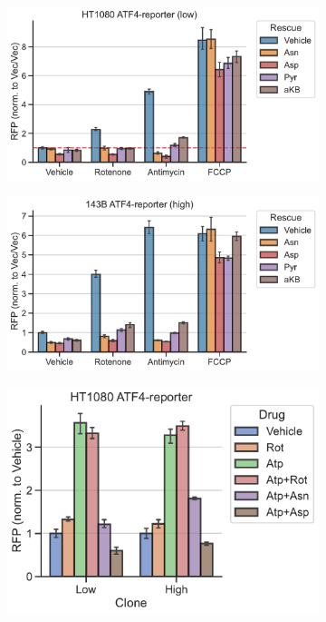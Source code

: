 \begin{figure}
     \centering
     \begin{subfigure}[b]{0.49\textwidth}
         \includegraphics[width=\textwidth]{figures/chap2/app/HT1080_ETCinhib_ATF4rep_low.pdf}
         \caption{}
         \label{fig:app_ch2:HT1080_ETCinhib_ATF4rep_low}
     \end{subfigure}
     \hfill
     \begin{subfigure}[b]{0.49\textwidth}
         \includegraphics[width=\textwidth]{figures/chap2/app/143B_ETCinhib_ATF4rep_high.pdf}
         \caption{}
         \label{fig:app_ch2:143B_ETCinhib_ATF4rep_high}
     \end{subfigure}
     \hfill
     \begin{subfigure}[b]{0.4\textwidth}
         \includegraphics[width=\textwidth]{figures/chap2/app/HT1080_Atp_ATF4rep.pdf}

\end{subfigure}
\end{figure}
